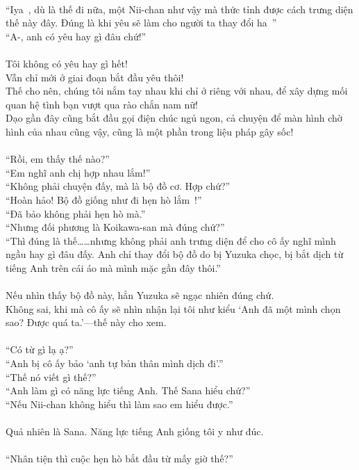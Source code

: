 \documentclass[12pt,a4paper, twosides]{book}
\begin{document}
\\
“Iya~, dù là thế đi nữa, một Nii-chan như vậy mà thức tỉnh được cách trưng diện thế này đây. Đúng là khi yêu sẽ làm cho người ta thay đổi ha~”\\
“A-, anh có yêu hay gì đâu chứ!”\\
\\
Tôi không có yêu hay gì hết!\\
Vẫn chỉ mới ở giai đoạn bắt đầu yêu thôi!\\
Thế cho nên, chúng tôi nắm tay nhau khi chỉ ở riêng với nhau, để xây dựng mối quan hệ tình bạn vượt qua rào chắn nam nữ!\\
Dạo gần đây cũng bắt đầu gọi điện chúc ngủ ngon, cả chuyện để màn hình chờ hình của nhau cũng vậy, cũng là một phần trong liệu pháp gây sốc!\\
\\
“Rồi, em thấy thế nào?”\\
“Em nghĩ anh chị hợp nhau lắm!”\\
“Không phải chuyện đấy, mà là bộ đồ cơ. Hợp chứ?”\\
“Hoàn hảo! Bộ đồ giống như đi hẹn hò lắm~!”\\
“Đã bảo không phải hẹn hò mà.”\\
“Nhưng đối phương là Koikawa-san mà đúng chứ?”\\
“Thì đúng là thế……nhưng không phải anh trưng diện để cho cô ấy nghĩ mình ngầu hay gì đâu đấy. Anh chỉ thay đổi bộ đồ do bị Yuzuka chọc, bị bắt dịch từ tiếng Anh trên cái áo mà mình mặc gần đây thôi.”\\
\\
Nếu nhìn thấy bộ đồ này, hẳn Yuzuka sẽ ngạc nhiên đúng chứ.\\
Không sai, khi mà cô ấy sẽ nhìn nhận lại tôi như kiểu ‘Anh đã một mình chọn sao? Được quá ta.’—thế này cho xem.\\
\\
“Có từ gì lạ ạ?”\\
“Anh bị cô ấy bảo ‘anh tự bản thân mình dịch đi’.”\\
“Thế nó viết gì thế?”\\
“Anh làm gì có năng lực tiếng Anh. Thế Sana hiểu chứ?”\\
“Nếu Nii-chan không hiểu thì làm sao em hiểu được.”\\
\\
Quả nhiên là Sana. Năng lực tiếng Anh giống tôi y như đúc.\\
\\
“Nhân tiện thì cuộc hẹn hò bắt đầu từ mấy giờ thế?”\\
\end{document}
